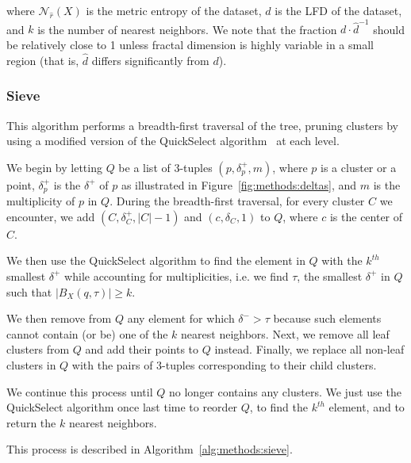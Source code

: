 where $\mathcal{N}_{\hat{r}}(X)$ is the metric entropy of the dataset, $d$ is the LFD of the dataset, and $k$ is the number of nearest neighbors.
We note that the fraction $d \cdot \hat{d}^{-1}$ should be relatively close to 1 unless fractal dimension is highly variable in a small region (that is, $\hat{d}$ differs significantly from $d$).


\subsubsection{Sieve}
\label{subsubsec:methods:knn:sieve}

This algorithm performs a breadth-first traversal of the tree, pruning clusters by using a modified version of the QuickSelect algorithm~\cite{hoare1961algorithm} at each level.

We begin by letting $Q$ be a list of 3-tuples $(p, \delta^{+}_{p}, m)$, where $p$ is a cluster or a point, $\delta^{+}_{p}$ is the $\delta^{+}$ of $p$ as illustrated in Figure~\ref{fig:methods:deltas}, and $m$ is the multiplicity of $p$ in $Q$.
During the breadth-first traversal, for every cluster $C$ we encounter, we add $(C, \delta^{+}_{C}, |C| - 1)$ and $(c, \delta_{C}, 1)$ to $Q$, where $c$ is the center of $C$.

We then use the QuickSelect algorithm to find the element in $Q$ with the $k^{th}$ smallest $\delta^{+}$ while accounting for multiplicities, i.e. we find $\tau$, the smallest $\delta^{+}$ in $Q$ such that $\left| B_X(q, \tau) \right| \geq k$.

We then remove from $Q$ any element for which $\delta^{-} > \tau$ because such elements cannot contain (or be) one of the $k$ nearest neighbors.
Next, we remove all leaf clusters from $Q$ and add their points to $Q$ instead.
Finally, we replace all non-leaf clusters in $Q$ with the pairs of 3-tuples corresponding to their child clusters.

We continue this process until $Q$ no longer contains any clusters.
We just use the QuickSelect algorithm once last time to reorder $Q$, to find the $k^{th}$ element, and to return the $k$ nearest neighbors.

This process is described in Algorithm~\ref{alg:methods:sieve}. 

